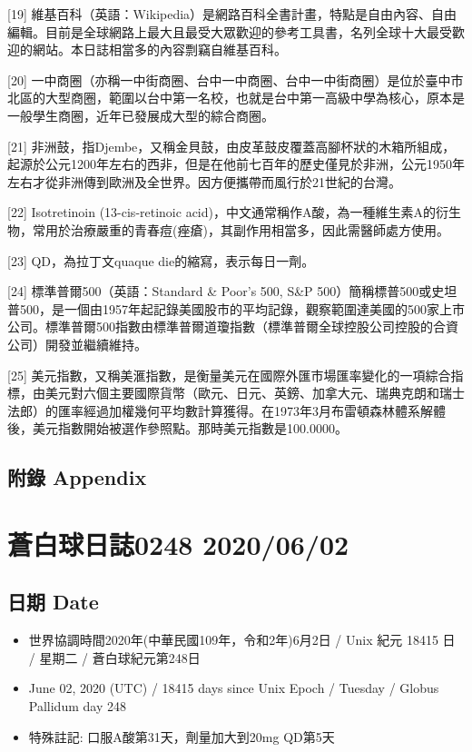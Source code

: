 \documentclass[
]{article}
\providecommand{\tightlist}{%
  \setlength{\itemsep}{0pt}\setlength{\parskip}{0pt}}
\begin{document}
{[}19{]}
維基百科（英語：Wikipedia）是網路百科全書計畫，特點是自由內容、自由編輯。目前是全球網路上最大且最受大眾歡迎的參考工具書，名列全球十大最受歡迎的網站。本日誌相當多的內容剽竊自維基百科。

{[}20{]}
一中商圈（亦稱一中街商圈、台中一中商圈、台中一中街商圈）是位於臺中市北區的大型商圈，範圍以台中第一名校，也就是台中第一高級中學為核心，原本是一般學生商圈，近年已發展成大型的綜合商圈。

{[}21{]}
非洲鼓，指Djembe，又稱金貝鼓，由皮革鼓皮覆蓋高腳杯狀的木箱所組成，起源於公元1200年左右的西非，但是在他前七百年的歷史僅見於非洲，公元1950年左右才從非洲傳到歐洲及全世界。因方便攜帶而風行於21世紀的台灣。

{[}22{]} Isotretinoin (13-cis-retinoic
acid)，中文通常稱作A酸，為一種維生素A的衍生物，常用於治療嚴重的青春痘(痤瘡)，其副作用相當多，因此需醫師處方使用。

{[}23{]} QD，為拉丁文quaque die的縮寫，表示每日一劑。

{[}24{]} 標準普爾500（英語：Standard \& Poor's 500, S\&P
500）簡稱標普500或史坦普500，是一個由1957年起記錄美國股市的平均記錄，觀察範圍達美國的500家上市公司。標準普爾500指數由標準普爾道瓊指數（標準普爾全球控股公司控股的合資公司）開發並繼續維持。

{[}25{]}
美元指數，又稱美滙指數，是衡量美元在國際外匯市場匯率變化的一項綜合指標，由美元對六個主要國際貨幣（歐元、日元、英鎊、加拿大元、瑞典克朗和瑞士法郎）的匯率經過加權幾何平均數計算獲得。在1973年3月布雷頓森林體系解體後，美元指數開始被選作參照點。那時美元指數是100.0000。

\hypertarget{ux9644ux9304-appendix}{%
\subsection{附錄 Appendix}\label{ux9644ux9304-appendix}}

\hypertarget{ux84bcux767dux7403ux65e5ux8a8c0248-20200602}{%
\section{蒼白球日誌0248
2020/06/02}\label{ux84bcux767dux7403ux65e5ux8a8c0248-20200602}}

\hypertarget{ux65e5ux671f-date-1}{%
\subsection{日期 Date}\label{ux65e5ux671f-date-1}}

\begin{itemize}
\tightlist
\item
  世界協調時間2020年(中華民國109年，令和2年)6月2日 / Unix 紀元 18415 日
  / 星期二 / 蒼白球紀元第248日
\item
  June 02, 2020 (UTC) / 18415 days since Unix Epoch / Tuesday / Globus
  Pallidum day 248
\item
  特殊註記: 口服A酸第31天，劑量加大到20mg QD第5天
\end{itemize}
\end{document}
